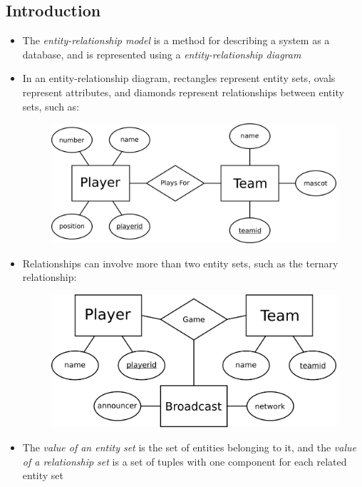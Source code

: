 \documentclass[a4paper]{article}
\begin{document}
\subsection{Introduction}
\begin{itemize}
\item The \emph{entity-relationship model} is a method for describing a system as a database, and is represented using a \emph{entity-relationship diagram}
\item In an entity-relationship diagram, rectangles represent entity sets, ovals represent attributes, and diamonds represent relationships between entity sets, such as:
\begin{figure}[H]
\centering
\includegraphics[width=0.5\linewidth]{entity1.png}
\end{figure}
\item Relationships can involve more than two entity sets, such as the ternary relationship:
\begin{figure}[H]
\centering
\includegraphics[width=0.5\linewidth]{entity2.png}
\end{figure}
\item The \emph{value of an entity set} is the set of entities belonging to it, and the \emph{value of a relationship set} is a set of tuples with one component for each related entity set

\end{itemize}
\end{document}
